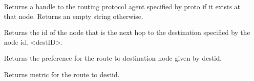 \begin{flushleft}

Returns a handle to the routing protocol agent specified by proto if it
exists at that node. Returns an empty string otherwise. 


Returns the id of the node that is the next hop to the destination
specified by the node id, <destID>. 


Returns the preference for the route to destination node given by destid.


Returns metric for the route to destid.

\end{flushleft}

\endinput

### Local Variables:
### mode: latex
### comment-column: 60
### backup-by-copying-when-linked: t
### file-precious-flag: nil
### End:
